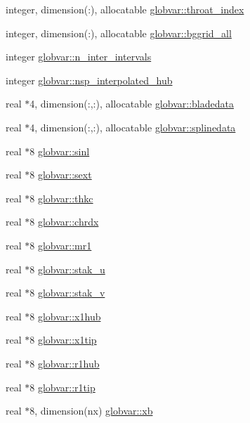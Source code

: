 \begin{DoxyCompactItemize}
integer, dimension(\+:), allocatable \hyperlink{namespaceglobvar_a63d910cfc844949f7d789af4f16e6695}{globvar\+::throat\+\_\+index}
\item 
integer, dimension(\+:), allocatable \hyperlink{namespaceglobvar_a62db14137ca5f48f595e1008d33688ab}{globvar\+::bggrid\+\_\+all}
\item 
integer \hyperlink{namespaceglobvar_ab00be7b1445612bf4318ec5e6f4ccce5}{globvar\+::n\+\_\+inter\+\_\+intervals}
\item 
integer \hyperlink{namespaceglobvar_ae37107e062abef0f5d095fbb2691aa3b}{globvar\+::nsp\+\_\+interpolated\+\_\+hub}
\item 
real $\ast$4, dimension(\+:,\+:), allocatable \hyperlink{namespaceglobvar_a19f797343d8c12180411f1e3f50c5209}{globvar\+::bladedata}
\item 
real $\ast$4, dimension(\+:,\+:), allocatable \hyperlink{namespaceglobvar_ae19ac4fbce29d3ec8bdd4a274023361f}{globvar\+::splinedata}
\item 
real $\ast$8 \hyperlink{namespaceglobvar_a9ed7026c367a81340ec32f8feac5d8b9}{globvar\+::sinl}
\item 
real $\ast$8 \hyperlink{namespaceglobvar_a8773a7a4d47bf7edb84938ff38c3e302}{globvar\+::sext}
\item 
real $\ast$8 \hyperlink{namespaceglobvar_a23dd44d4f0c8b5be47685d9c5ee98041}{globvar\+::thkc}
\item 
real $\ast$8 \hyperlink{namespaceglobvar_a64b336f7ef2076d0b30fb86f6fe0ba1c}{globvar\+::chrdx}
\item 
real $\ast$8 \hyperlink{namespaceglobvar_aef87425714082b77e0f5f6fce2787666}{globvar\+::mr1}
\item 
real $\ast$8 \hyperlink{namespaceglobvar_a4f016b27bfa551903a9ff434167e63bb}{globvar\+::stak\+\_\+u}
\item 
real $\ast$8 \hyperlink{namespaceglobvar_af534fe32dd8a023b0311416cbffea2f7}{globvar\+::stak\+\_\+v}
\item 
real $\ast$8 \hyperlink{namespaceglobvar_a97e3fd0f031b96c6a64f2b048bd344f6}{globvar\+::x1hub}
\item 
real $\ast$8 \hyperlink{namespaceglobvar_ae73d73414e05c7ff4485109025aebb8b}{globvar\+::x1tip}
\item 
real $\ast$8 \hyperlink{namespaceglobvar_a23bf2eee6718016ef422ea6f1a96774a}{globvar\+::r1hub}
\item 
real $\ast$8 \hyperlink{namespaceglobvar_a925bcdc500de307bc4848f7ddc9a2574}{globvar\+::r1tip}
\item 
real $\ast$8, dimension(nx) \hyperlink{namespaceglobvar_af4daba9dc0eb452ca6d91e10550fa072}{globvar\+::xb}

\end{DoxyCompactItemize}
